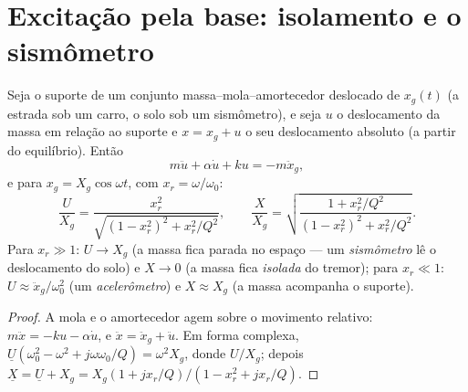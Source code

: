 \section{Excitação pela base: isolamento e o sismômetro}

\begin{proposition}\label{prop:b1:oscillators-resonance:base}
Seja o suporte de um conjunto massa--mola--amortecedor deslocado de $x_g(t)$ (a estrada
sob um carro, o solo sob um sismômetro), e seja $u$ o
deslocamento da massa em relação ao suporte e $x = x_g + u$ o seu
deslocamento absoluto (a partir do equilíbrio). Então
\[
m\ddot u + \alpha\dot u + ku = -m\ddot x_g ,
\]
e para $x_g = X_g\cos\omega t$, com $x_r = \omega/\omega_0$:
\[
\frac{U}{X_g} = \frac{x_r^2}{\sqrt{(1 - x_r^2)^2 + x_r^2/Q^2}},
\qquad
\frac{X}{X_g} = \sqrt{\frac{1 + x_r^2/Q^2}{(1 - x_r^2)^2 + x_r^2/Q^2}} .
\]
Para $x_r \gg 1$: $U \to X_g$ (a massa fica parada no espaço --- um
\emph{sismômetro} lê o deslocamento do solo) e $X \to 0$ (a
massa fica \emph{isolada} do tremor); para $x_r \ll 1$: $U \approx
\ddot x_g/\omega_0^2$ (um \emph{acelerômetro}) e $X \approx X_g$ (a massa
acompanha o suporte).
\end{proposition}

\begin{proof}
A mola e o amortecedor agem sobre o movimento relativo: $m\ddot x = -ku -
\alpha\dot u$, e $\ddot x = \ddot x_g + \ddot u$. Em forma complexa,
$\underline U(\omega_0^2 - \omega^2 + j\omega\omega_0/Q) = \omega^2X_g$, donde
$U/X_g$; depois $\underline X = \underline U + X_g = X_g(1 + jx_r/Q)/(1 -
x_r^2 + jx_r/Q)$.
\end{proof}

